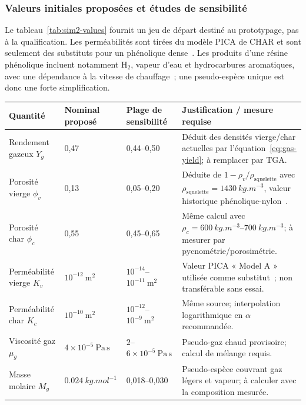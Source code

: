 \documentclass[oneside,openany]{amsdtx}
\begin{document}
\subsubsection{Valeurs initiales proposées et études de sensibilité}

Le tableau~\ref{tab:sim2-values} fournit un jeu de départ destiné au prototypage,
pas à la qualification. Les perméabilités sont tirées du modèle PICA de CHAR et
sont seulement des substituts pour un phénolique dense~\cite{amar2016}. Les
produits d'une résine phénolique incluent notamment \(\mathrm{H_2}\), vapeur
d'eau et hydrocarbures aromatiques, avec une dépendance à la vitesse de
chauffage~\cite{bessire2023}; une pseudo-espèce unique est donc une forte
simplification.

\begin{table}[H]
\centering
\scriptsize
\renewcommand{\arraystretch}{1.18}
\begin{tabular}{L{0.18\textwidth}M{0.16\textwidth}M{0.18\textwidth}L{0.38\textwidth}}
\toprule
\textbf{Quantité} & \textbf{Nominal proposé} & \textbf{Plage de sensibilité} & \textbf{Justification / mesure requise} \\
\midrule
Rendement gazeux \(Y_g\) & 0,47 & 0,44--0,50 & Déduit des densités vierge/char actuelles par l'équation~\eqref{eq:gas-yield}; à remplacer par TGA. \\
Porosité vierge \(\phi_v\) & 0,13 & 0,05--0,20 & Déduite de \(1-\rho_v/\rho_\mathrm{squelette}\) avec \(\rho_\mathrm{squelette}=\SI{1430}{kg.m^{-3}}\), valeur historique phénolique-nylon~\cite{clark1972}. \\
Porosité char \(\phi_c\) & 0,55 & 0,45--0,65 & Même calcul avec \(\rho_c=\SIrange{600}{700}{kg.m^{-3}}\); à mesurer par pycnométrie/porosimétrie. \\
Perméabilité vierge \(K_v\) & \(10^{-12}\ \mathrm{m^2}\) & \(10^{-14}\)--\(10^{-11}\ \mathrm{m^2}\) & Valeur PICA « Model A » utilisée comme substitut~\cite{amar2016}; non transférable sans essai. \\
Perméabilité char \(K_c\) & \(10^{-10}\ \mathrm{m^2}\) & \(10^{-12}\)--\(10^{-9}\ \mathrm{m^2}\) & Même source; interpolation logarithmique en \(\alpha\) recommandée. \\
Viscosité gaz \(\mu_g\) & \(4\times10^{-5}\ \mathrm{Pa\,s}\) & \(2\)--\(6\times10^{-5}\ \mathrm{Pa\,s}\) & Pseudo-gaz chaud provisoire; calcul de mélange requis. \\
Masse molaire \(M_g\) & \(\SI{0.024}{kg.mol^{-1}}\) & 0,018--0,030 & Pseudo-espèce couvrant gaz légers et vapeur; à calculer avec la composition mesurée. \\

\end{tabular}
\end{table}
\end{document}
